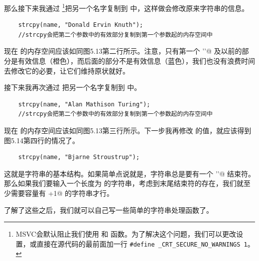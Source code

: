 那么接下来我通过 \lstinline@strcpy@\footnote{MSVC会默认阻止我们使用 \lstinline@strcpy@ 和 \lstinline@strncpy@ 函数。为了解决这个问题，我们可以更改设置，或直接在源代码的最前面加一行 \texttt{\#define \_CRT\_SECURE\_NO\_WARNINGS 1}。}把另一个名字复制到 \lstinline@name@ 中，这样做会修改原来字符串的信息。
\begin{lstlisting}
    strcpy(name, "Donald Ervin Knuth");
    //strcpy会把第二个参数中的有效部分复制到第一个参数起的内存空间中
\end{lstlisting}
现在 \lstinline@name@ 的内存空间应该如同图5.13第二行所示。注意，只有第一个 \lstinline@'\0'@ 及以前的部分是有效信息（橙色），而后面的部分不是有效信息（蓝色），我们也没有浪费时间去修改它的必要，让它们维持原状就好。\par
接下来我再次通过 \lstinline@strcpy@ 把另一个名字复制到 \lstinline@name@ 中。
\begin{lstlisting}
    strcpy(name, "Alan Mathison Turing");
    //strcpy会把第二个参数中的有效部分复制到第一个参数起的内存空间中
\end{lstlisting}
现在 \lstinline@name@ 的内存空间应该如同图5.13第三行所示。下一步我再修改 \lstinline@name@ 的值，就应该得到图5.14第四行的情况了。
\begin{lstlisting}
    strcpy(name, "Bjarne Stroustrup");
\end{lstlisting}\par
这就是字符串的基本结构。如果简单点说就是，字符串总是要有一个 \lstinline@'\0'@ 结束符。那么如果我们要输入一个长度为 \lstinline@n@ 的字符串，考虑到末尾结束符的存在，我们就至少需要容量有 \lstinline@n+1@ 的字符串才行。\par
了解了这些之后，我们就可以自己写一些简单的字符串处理函数了。\par
